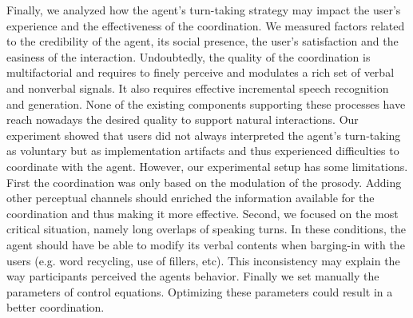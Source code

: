 Finally, we analyzed how the agent's turn-taking strategy may impact the user's experience and the effectiveness of the coordination.
We measured factors related to the credibility of the agent, its social presence, the user's satisfaction and the easiness of the interaction.  
Undoubtedly, the quality of the coordination is multifactorial and requires to finely perceive and modulates a rich set of verbal and nonverbal signals. It also requires effective incremental speech recognition and generation. None of the existing components supporting these processes have reach nowadays the desired quality to support natural interactions. Our experiment showed that users did not always interpreted the agent's turn-taking as voluntary but as implementation artifacts and thus experienced difficulties to coordinate with the agent. 
However, our experimental setup has some limitations. 
First the coordination was only based on the modulation of the prosody. Adding other perceptual channels should enriched the information available for the coordination and thus making it more effective.
Second, we focused on the most critical situation, namely long overlaps of speaking turns. In these conditions, the agent should have be able to modify its verbal contents when barging-in with the users (e.g. word recycling, use of fillers, etc). This inconsistency may explain the way participants perceived the agents behavior. 
Finally we set manually the parameters of control equations. Optimizing these parameters could result in a better coordination. 

